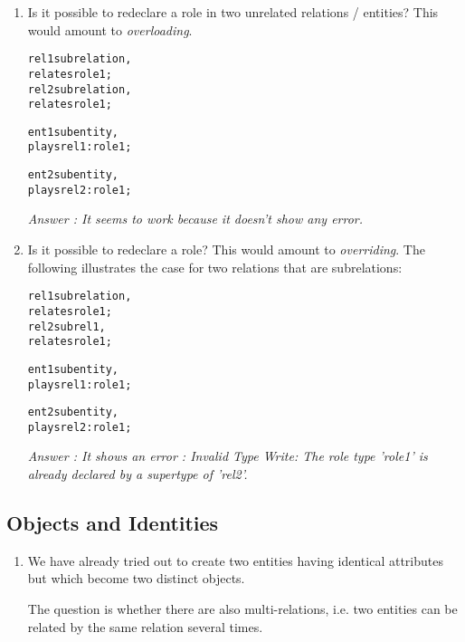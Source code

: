 \documentclass[runningheads]{llncs}
\begin{document}
\begin{enumerate}
\item Is it possible to redeclare a role in two unrelated relations /
  entities? This would amount to \emph{overloading}.

  \begin{alltt}
rel1 sub relation,
     relates role1;
rel2 sub relation,
     relates role1;

ent1 sub entity,
  plays rel1:role1;

ent2 sub entity,
  plays rel2:role1;
  \end{alltt}
  
 
\emph{Answer : It seems to work because it doesn't show any error. }
 
\item Is it possible to redeclare a role? This would amount to
  \emph{overriding}. The following illustrates the case for two relations that
  are subrelations:
  
  \begin{alltt}
rel1 sub relation,
     relates role1;
rel2 sub rel1,
     relates role1;

ent1 sub entity,
  plays rel1:role1;

ent2 sub entity,
  plays rel2:role1;
  \end{alltt}

\emph{Answer : It shows an error : Invalid Type Write: The role type 'role1' is already declared by a supertype of 'rel2'. }
  

\end{enumerate}


\subsection{Objects and Identities}

\begin{enumerate}
\item We have already tried out to create two entities having identical
  attributes but which become two distinct objects.

  The question is whether there are also multi-relations, i.e. two entities
  can be related by the same relation several times.
\end{enumerate}



\end{document}
